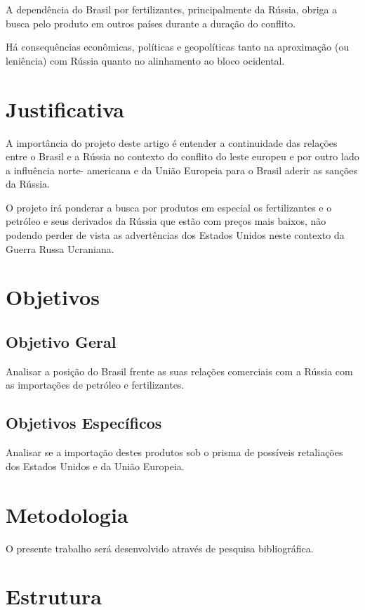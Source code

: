\documentclass[article,12pt,oneside,a4paper,english,brazil,sumario=tradicional]{abntex2}
\begin{document}
A dependência do Brasil por fertilizantes, principalmente da Rússia, obriga a busca pelo produto em outros países durante a duração do conflito.

Há consequências econômicas, políticas e geopolíticas tanto na aproximação (ou leniência) com Rússia quanto no alinhamento ao bloco ocidental.


\section*{Justificativa}

A importância do projeto deste artigo é entender a continuidade das relações entre o Brasil e a Rússia no contexto do conflito do leste europeu  e por outro lado a influência norte- americana e da União Europeia para o Brasil aderir as sanções da Rússia.

O projeto irá ponderar a busca por produtos em especial os fertilizantes e o petróleo e seus derivados da Rússia que estão com preços mais baixos, não podendo perder de vista as advertências dos Estados Unidos neste contexto da Guerra Russa Ucraniana.

\section*{Objetivos}

\subsection*{Objetivo Geral}

Analisar a posição do Brasil frente as suas relações comerciais com a Rússia com as importações de petróleo e fertilizantes.

\subsection*{Objetivos Específicos}

Analisar se a importação destes produtos sob o prisma de possíveis retaliações dos Estados Unidos e da União Europeia.

\section*{Metodologia}

O presente trabalho será desenvolvido através de pesquisa bibliográfica.

\section*{Estrutura}
\end{document}

